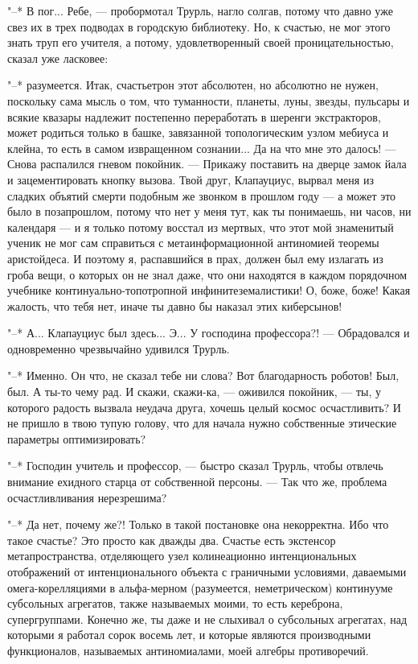 "--* В пог... Ребе, --- пробормотал Трурль, нагло солгав,
потому что давно уже свез их в трех подводах в городскую
библиотеку. Но, к счастью, не мог этого знать труп его
учителя, а потому, удовлетворенный своей проницательностью,
сказал уже ласковее:

"--* разумеется. Итак, счастьетрон этот абсолютен, но
абсолютно не нужен, поскольку сама мысль о том, что
туманности, планеты, луны, звезды, пульсары и всякие квазары
надлежит постепенно переработать в шеренги экстракторов,
может родиться только в башке, завязанной топологическим
узлом мебиуса и клейна, то есть в самом извращенном
сознании... Да на что мне это далось! --- Снова распалился
гневом покойник. --- Прикажу поставить на дверце замок йала и
зацементировать кнопку вызова. Твой друг, Клапауциус, вырвал
меня из сладких объятий смерти подобным же звонком в прошлом
году --- а может это было в позапрошлом, потому что нет у меня
тут, как ты понимаешь, ни часов, ни календаря --- и я только
потому восстал из мертвых, что этот мой знаменитый ученик не
мог сам справиться с метаинформационной антиномией теоремы
аристойдеса. И поэтому я, распавшийся в прах, должен был ему
излагать из гроба вещи, о которых он не знал даже, что они
находятся в каждом порядочном учебнике
континуально-топотропной инфинитеземалистики! О, боже, боже!
Какая жалость, что тебя нет, иначе ты давно бы наказал этих
киберсынов!

"--* А... Клапауциус был здесь... Э... У господина
профессора?! --- Обрадовался и одновременно чрезвычайно
удивился Трурль.

"--* Именно. Он что, не сказал тебе ни слова? Вот
благодарность роботов! Был, был. А ты-то чему рад. И скажи,
скажи-ка, --- оживился покойник, --- ты, у которого радость
вызвала неудача друга, хочешь целый космос осчастливить? И
не пришло в твою тупую голову, что для начала нужно
собственные этические параметры оптимизировать?

"--* Господин учитель и профессор, --- быстро сказал Трурль,
чтобы отвлечь внимание ехидного старца от собственной
персоны. --- Так что же, проблема осчастливливания
нерезрешима?

"--* Да нет, почему же?! Только в такой постановке она
некорректна. Ибо что такое счастье? Это просто как дважды
два. Счастье есть экстенсор метапространства, отделяющего
узел колинеационно интенциональных отображений от
интенционального объекта с граничными условиями, даваемыми
омега-корелляциями в альфа-мерном (разумеется,
неметрическом) континууме субсольных агрегатов, также
называемых моими, то есть кереброна, супергруппами. Конечно
же, ты даже и не слыхивал о субсольных агрегатах, над
которыми я работал сорок восемь лет, и которые являются
производными функционалов, называемых антиномиалами, моей
алгебры противоречий.

